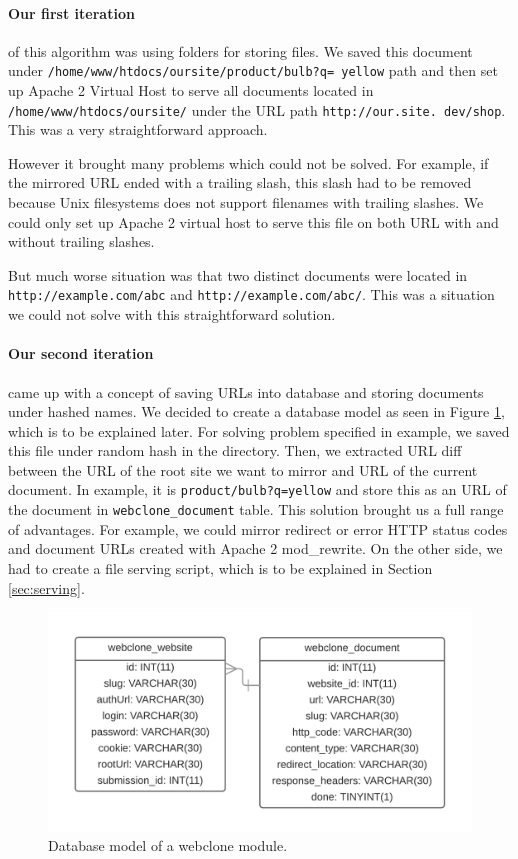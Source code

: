 \paragraph{Our first iteration} of this algorithm was using folders for storing files. We saved this document under \texttt{/home/www/htdocs/oursite/product/bulb?q= yellow} path and then set up Apache 2 Virtual Host to serve all documents located in \texttt{/home/www/htdocs/oursite/} under the URL path \texttt{http://our.site. dev/shop}. This was a very straightforward approach.

However it brought many problems which could not be solved. For example, if the mirrored URL ended with a trailing slash,  this slash had to be removed because Unix filesystems does not support filenames with trailing slashes. We could only set up Apache 2 virtual host to serve this file on both URL with and without trailing slashes.

But much worse situation was that two distinct documents were located in \texttt{http://example.com/abc} and \texttt{http://example.com/abc/}. This was a situation we could not solve with this straightforward solution.

\paragraph{Our second iteration} came up with a concept of saving URLs into database and storing documents under hashed names. We decided to create a database model as seen in Figure \ref{webclonemodel}, which is to be explained later. For solving problem specified in example, we saved this file under random hash in the directory. Then, we extracted URL diff between the URL of the root site we want to mirror and URL of the current document. In example, it is \texttt{product/bulb?q=yellow} and store this as an URL of the document in \texttt{webclone\_document} table. This solution brought us a full range of advantages. For example, we could mirror redirect or error HTTP status codes and document URLs created with Apache 2 mod\_rewrite. On the other side, we had to create a file serving script, which is to be explained in Section \ref{sec:serving}.

\begin{figure}[h]
    \centering
    \includegraphics[width=\textwidth]{images/databaseWebclone.png}
    \caption{Database model of a webclone module.}
    \label{webclonemodel}
\end{figure}

